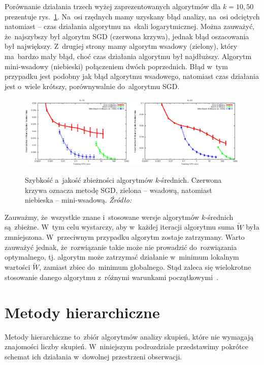 \documentclass{praca1}
\begin{document}
Porównanie działania trzech wyżej zaprezentowanych algorytmów dla $k=10, 50$ prezentuje rys.~\ref{plot:000}. Na~osi rzędnych mamy uzyskany błąd analizy, na~osi odciętych natomiast -- czas działania algorytmu na~skali logarytmicznej. Można zauważyć, że~najszybszy był algorytm SGD (czerwona krzywa), jednak błąd oszacowania był największy. Z~drugiej strony mamy algorytm wsadowy (zielony), który ma~bardzo mały błąd, choć czas działania algorytmu był najdłuższy. Algorytm mini-wsadowy (niebieski) połączeniem dwóch poprzednich. Błąd w~tym przypadku jest podobny jak błąd algorytmu wsadowego, natomiast czas działania jest o~wiele krótszy, porównywalnie do~algorytmu SGD. 

\begin{figure}[!h]
  \centering
  \includegraphics[width=450pt]{plot0.png}\\
  \caption{Szybkość a~jakość zbieżności algorytmów $k$-średnich. Czerwona krzywa oznacza metodę SGD, zielona -- wsadową, natomiast niebieska -- mini-wsadową. \emph{Źródło:}~\cite{Sculley2010:webkmeans}}\label{plot:000}
\end{figure}


Zauważmy, że~wszystkie znane i~stosowane wersje algorytmów $k$-średnich są~zbieżne. W~tym celu wystarczy, aby w~każdej iteracji algorytmu suma $\widetilde{W}$ była zmniejszona. W~przeciwnym przypadku algorytm zostaje zatrzymany. Warto zauważyć jednak, że~rozwiązanie takie może nie prowadzić do~rozwiązania optymalnego, tj. algorytm może zatrzymać działanie w~minimum lokalnym wartości $\widetilde{W}$, zamiast zbiec do~minimum globalnego. Stąd zaleca się wielokrotne stosowanie danego algorytmu z~różnymi warunkami początkowymi~\cite{Koronacki2005:statystyczne}.


\section{Metody hierarchiczne}

Metody hierarchiczne to~zbiór algorytmów analizy skupień, które nie wymagają znajomości liczby skupień. W~niniejszym podrozdziale przedstawimy pokrótce schemat ich działania w~dowolnej przestrzeni obserwacji.
\end{document}
